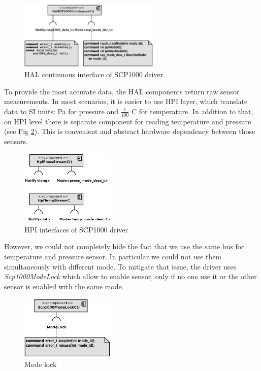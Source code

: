 \begin{figure}[h]
  \centering
  \includegraphics[width=0.6\textwidth]{diagrams/scp1000_continous.eps}
  \caption{HAL continuous interface of SCP1000 driver}
  \label{fig:scp1000_continous}
\end{figure}

To provide the most accurate data, the HAL components return raw sensor measurements.
In most scenarios, it is easier to use HPI layer, which translate data to SI units: Pa for pressure and $\frac{1}{100}$ C for temperature.
In addition to that, on HPI level there is separate component for reading temperature and pressure (see Fig \ref{fig:scp1000_hpi}).
This is convenient and abstract hardware dependency between those sensors.

\begin{figure}[h]
  \centering
  \includegraphics[width=0.4\textwidth]{diagrams/scp1000_hpi.eps}
  \caption{HPI interfaces of SCP1000 driver}
  \label{fig:scp1000_hpi}
\end{figure}

However, we could not completely hide the fact that we use the same bus for temperature and pressure sensor.
In particular we could not use them simultaneously with different mode.
To mitigate that issue, the driver uses \emph{Scp1000ModeLock} which allow to enable sensor, only if no one use it or the other sensor is enabled with the same mode.

\begin{figure}[h]
  \centering
  \includegraphics[width=0.4\textwidth]{diagrams/scp1000_lock.eps}
  \caption{Mode lock}
  \label{fig:scp1000_lock}
\end{figure}









